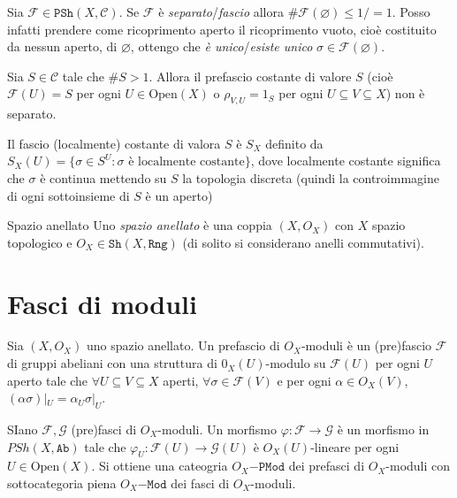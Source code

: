\begin{remark}{}
    Sia \(\mathcal{F} \in \mathtt{PSh}{(X, \mathcal{C})}\). Se \(\mathcal{F}\) è
    \emph{separato}/\emph{fascio} allora \(\# \mathcal{F}{(\varnothing)} \le 1 /
    = 1\). Posso infatti prendere come ricoprimento aperto il ricoprimento
    vuoto, cioè costituito da nessun aperto, di \(\varnothing\), ottengo che
    \emph{è unico}/\emph{esiste unico} \(\sigma \in \mathcal{F}{(\varnothing)}\).
\end{remark}

\begin{example}{}
    Sia \(S \in \mathcal{C}\) tale che \(\# S > 1\). Allora il prefascio
    costante di valore \(S\) (cioè \(\mathcal{F}{(U)} = S\) per ogni \(U \in
    \mathrm{Open}{(X)}\) o \(\rho_{V, U} = 1_S\) per ogni \(U \subseteq V
    \subseteq X\)) non è separato.

    Il fascio (localmente) costante di valora \(S\) è \(S_X\) definito da \(S_X
    {(U)} = \{\sigma \in S^{U} : \sigma \text{ è localmente costante}\}\), dove
    localmente costante significa che \(\sigma\) è continua mettendo su \(S\) la
    topologia discreta (quindi la controimmagine di ogni sottoinsieme di \(S\) è
    un aperto)
\end{example}

\begin{definition}{Spazio anellato}
    Uno \emph{spazio anellato} è una coppia \({(X, O_X)}\) con \(X\) spazio
    topologico e \(O_X \in \mathtt{Sh}{(X, \mathtt{Rng})}\) (di solito si
    considerano anelli commutativi).
\end{definition}

\section{Fasci di moduli}

\begin{definition}{}
    Sia \({(X, O_X)}\) uno spazio anellato. Un prefascio di \(O_X\)-moduli è un
    (pre)fascio \(\mathcal{F}\) di gruppi abeliani con una struttura di
    \(0_X{(U)}\)-modulo su \(\mathcal{F}{(U)}\) per ogni \(U\) aperto tale che
    \(\forall  U \subseteq V \subseteq X  \) aperti, \(\forall \sigma \in
    \mathcal{F}{(V)}\) e per ogni \(\alpha \in O_X{(V)} \), \((\alpha
    \sigma)|_{U}  = \alpha_U \sigma|_U\).
\end{definition}

SIano \(\mathcal{F}, \mathcal{G}\) (pre)fasci di \(O_X\)-moduli. Un morfismo
\(\varphi  : \mathcal{F} \to \mathcal{G}\) è un morfismo in \(PSh{(X,
\mathtt{Ab})}\) tale che \(\varphi _U : \mathcal{F}{(U)} \to \mathcal{G}{(U)}\)
è \(O_X{(U)}\)-lineare per ogni \(U \in \mathrm{Open}{(X)}\). Si ottiene una
cateogria \(O_X\mathtt{-PMod}\) dei prefasci di \(O_X\)-moduli con
sottocategoria piena \(O_X\mathtt{-Mod}\) dei fasci di \(O_X\)-moduli.

